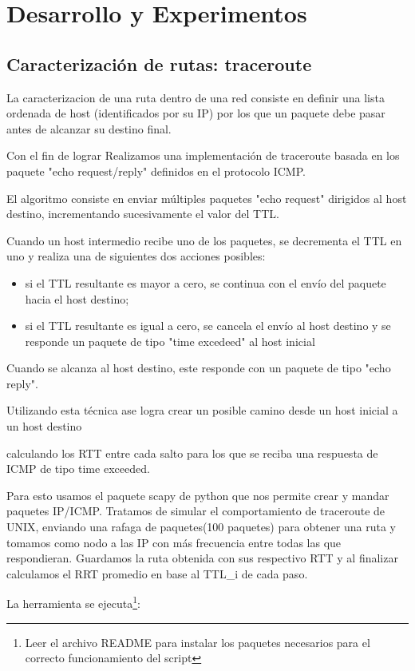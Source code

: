 \section{Desarrollo y Experimentos}

\subsection{Caracterización de rutas: traceroute}
La caracterizacion de una ruta dentro de una red consiste en definir una lista ordenada de host (identificados por su IP) por los que un paquete debe pasar antes de alcanzar su destino final.

Con el fin de lograr Realizamos una implementación de traceroute basada en los paquete  "echo request/reply" definidos en el protocolo ICMP.

El algoritmo consiste en enviar múltiples paquetes "echo request" dirigidos al host destino, incrementando sucesivamente el valor del TTL.

Cuando un host intermedio recibe uno de los paquetes, se decrementa el TTL en uno y realiza una de siguientes dos acciones posibles:
\begin{itemize}
\item{si el TTL resultante es mayor a cero, se continua con el envío del paquete hacia el host destino;}
\item{si el TTL resultante es igual a cero, se cancela el envío al host destino y se responde un paquete de tipo "time excedeed" al host inicial}
 \end{itemize}

Cuando se alcanza al host destino, este responde con un paquete de tipo "echo reply".

Utilizando esta técnica ase logra crear un posible camino desde un host inicial a un host destino




calculando los RTT entre cada salto para los que se reciba una respuesta de ICMP de tipo time exceeded.

Para esto usamos el paquete scapy de python que nos permite crear y mandar paquetes IP/ICMP. Tratamos de simular el comportamiento de traceroute de UNIX, enviando una rafaga de paquetes(100 paquetes) para obtener una ruta y tomamos como nodo a las IP con más frecuencia entre todas las que respondieran.
Guardamos la ruta obtenida con sus respectivo RTT  y al finalizar calculamos el RRT promedio en base al TTL\_{i} de cada paso.

La herramienta se ejecuta\footnote{Leer el archivo README para instalar los paquetes necesarios para el correcto funcionamiento del script}:

